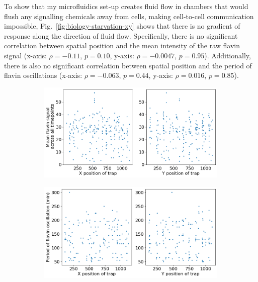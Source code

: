 To show that my microfluidics set-up creates fluid flow in chambers that would flush any signalling chemicals away from cells, making cell-to-cell communication impossible, Fig.\ \ref{fig:biology-starvation-xy} shows that there is no gradient of response along the direction of fluid flow.
Specifically, there is no significant correlation between spatial position and the mean intensity of the raw flavin signal (x-axis: $\rho = -0.11$, $p = 0.10$, y-axis: $\rho = -0.0047$, $p = 0.95$).
Additionally, there is also no significant correlation between spatial position and the period of flavin oscillations (x-axis: $\rho = -0.063$, $p = 0.44$, y-axis: $\rho = 0.016$, $p = 0.85$).

\begin{figure}[ht!]
  \centering
  \begin{subfigure}[htpb]{0.8\textwidth}
   \centering
   \includegraphics[width=\textwidth]{19972_xy_flavin_signal.png}
   \caption{
   }
   \label{fig:biology-starvation-xy-signal}
  \end{subfigure}

  \begin{subfigure}[htpb]{0.8\textwidth}
   \centering
   \includegraphics[width=\textwidth]{19972_xy_flavin_period.png}
   \caption{
   }
   \label{fig:biology-starvation-xy-signal}
  \end{subfigure}


\end{figure}
